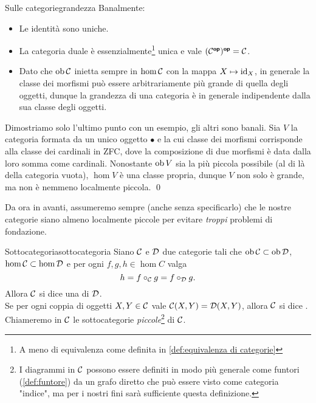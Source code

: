 \documentclass{article}
\renewcommand\C{\mc{C}}
\newcommand\D{\mc{D}}
\begin{document}
\begin{remark}{Sulle categorie}{grandezza}
    Banalmente:\begin{itemize}
        \item Le identità sono uniche.
        \item La categoria duale è essenzialmente\footnote{A meno di equivalenza come definita in \ref{def:equivalenza di categorie}} unica e vale $(\C^\op)^\op = \C$.
        \item Dato che $\ob\C$ inietta sempre in $\hom\C$ con la mappa $X\mapsto \operatorname{id}_X$, in generale la classe dei morfismi può essere arbitrariamente più grande di quella degli oggetti, dunque la grandezza di una categoria è in generale indipendente dalla sua classe degli oggetti.
    \end{itemize} 
    \proof 
    Dimostriamo solo l'ultimo punto con un esempio, gli altri sono banali. Sia $V$ la categoria formata da un unico oggetto $\bullet$ e la cui classe dei morfismi corrisponde alla classe dei cardinali in ZFC, dove la composizione di due morfismi è data dalla loro somma come cardinali. Nonostante $\operatorname{ob} V$ sia la più piccola possibile (al di là della categoria vuota), $\hom V$ è una classe propria, dunque $V$ non solo è grande, ma non è nemmeno localmente piccola.
    \qed
\end{remark}

Da ora in avanti, assumeremo sempre (anche senza specificarlo) che le nostre categorie siano almeno localmente piccole per evitare \textit{troppi} problemi di fondazione.

\begin{definition}{Sottocategoria}{sottocategoria}
    Siano $\C$ e $\D$ due categorie tali che $\ob\C \subset \ob\D$, $\hom\C \subset \hom\D$ e per ogni $f,g,h \in \hom C$ valga 
    \[h = f\circ_\C g = f\circ_\D g.\]
    Allora $\C$ si dice una  di $\D$.\\
    Se per ogni coppia di oggetti $X,Y \in \C$ vale $\C(X,Y)=\D(X,Y)$, allora $\C$ si dice .\\
    Chiameremo  in $\C$ le sottocategorie \textit{piccole}\footnote{I diagrammi in $\C$ possono essere definiti in modo più generale come funtori (\ref{def:funtore}) da un grafo diretto che può essere visto come categoria "indice", ma per i nostri fini sarà sufficiente questa definizione.} di $\C$.
\end{definition}
\end{document}
